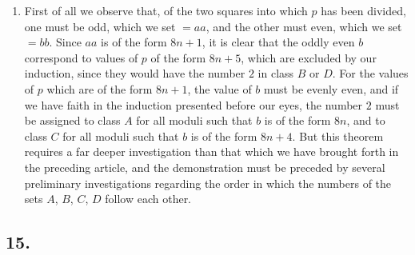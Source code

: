 \documentclass[twoside,12pt]{memoir}
\begin{document}
\begin{enumerate}
    \item First of all we observe that, of the two squares into which \(p\) has been divided, one must be odd, which we set \(=a a\), and the other must even, which we set \(=b b\). Since \(a a\) is of the form \(8 n+1\), it is clear that the oddly even \(b\) correspond to values of \(p\) of the form \(8 n+5\), which are excluded by our induction, since they would have the number \(2\) in class \(B\) or \(D\). For the values of \(p\) which are of the form \(8 n+1\), the value of \(b\) must be evenly even, and if we have faith in the induction presented before our eyes, the number \(2\) must be assigned to class \(A\) for all moduli such that \(b\) is of the form \(8 n\), and to class \(C\) for all moduli such that \(b\) is of the form \(8 n+4\). But this theorem requires a far deeper investigation than that which we have brought forth in the preceding article, and the demonstration must be preceded by several preliminary investigations regarding the order in which the numbers of the sets \(A\), \(B\), \(C\), \(D\) follow each other.
\end{enumerate}
%

\subsection*{15.}
\end{document}
